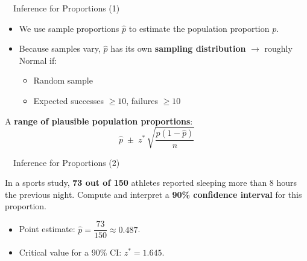\documentclass[aspectratio=169,11pt]{beamer}
\begin{document}
\begin{frame}{\ \ Inference for Proportions (1)}
  \begin{itemize}
    \item We use sample proportions $\hat{p}$ to estimate the population
          proportion $p$.
    \item Because samples vary, $\hat{p}$ has its own \textbf{sampling
          distribution} $\rightarrow$ roughly Normal if:
      \begin{itemize}
        \item Random sample
        \item Expected successes $\geq 10$, failures $\geq 10$
      \end{itemize}
  \end{itemize}
  \vspace{0.4em}
  \begin{keybox}
    A \textbf{range of plausible population proportions}:
    \begin{equation*}
      \hat{p} \;\pm\; z^{*}\,\sqrt{\dfrac{\hat{p}(1-\hat{p})}{n}}
    \end{equation*}
  \end{keybox}
\end{frame}

\begin{frame}{\ \ Inference for Proportions (2)}
  \begin{keybox}[Example]
    In a sports study, \textbf{73 out of 150} athletes reported sleeping more
    than 8 hours the previous night. Compute and interpret a \textbf{90\%
    confidence interval} for this proportion.
  \end{keybox}
  \vspace{0.8em}
  \begin{itemize}
    \item Point estimate: $\hat{p} = \dfrac{73}{150} \approx 0.487$.
    \item Critical value for a 90\% CI: $z^{*} = 1.645$.
  \end{itemize}
\end{frame}
\end{document}
